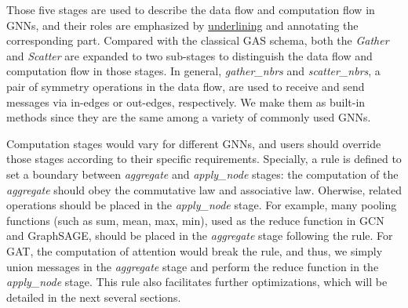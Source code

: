 \documentclass[conference]{IEEEtran}
\begin{document}

Those five stages are used to describe the data flow and computation flow in GNNs, and their roles are emphasized by \underline{underlining} and annotating the corresponding part.
Compared with the classical GAS schema, both the \emph{Gather} and \emph{Scatter} are expanded to two sub-stages to distinguish the data flow and computation flow in those stages.
In general, \emph{gather\_nbrs} and \emph{scatter\_nbrs}, a pair of symmetry operations in the data flow, are used to receive and send messages via in-edges or out-edges, respectively.
We make them as built-in methods since they are the same among a variety of commonly used GNNs.

Computation stages would vary for different GNNs, and users should override those stages according to their specific requirements.
Specially, a rule is defined to set a boundary between \emph{aggregate} and \emph{apply\_node} stages: the computation of the \emph{aggregate} should obey the commutative law and associative law. Oherwise, related operations should be placed in the \emph{apply\_node} stage.
For example, many pooling functions (such as sum, mean, max, min), used as the reduce function in GCN and GraphSAGE, should be placed in the \emph{aggregate} stage following the rule.
For GAT, the computation of attention would break the rule, and thus, we simply union messages in the \emph{aggregate} stage and perform the reduce function in the \emph{apply\_node} stage.
This rule also facilitates further optimizations, which will be detailed in the next several sections.


\end{document}
